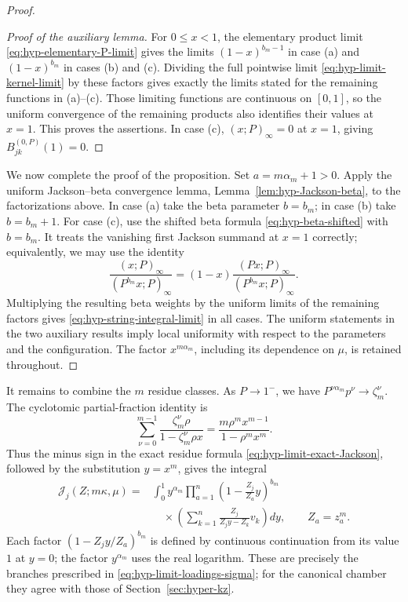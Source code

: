 \documentclass[12pt]{amsart}
\theoremstyle{definition}
\numberwithin{equation}{section}
\theoremstyle{definition}
\let\mc\mathcal
\let\ka\kappa
\let\le\leqslant
\def\beq{\begin{equation}}
\def\eeq{\end{equation}}
\begin{document}
\begin{proof}
\begin{proof}[Proof of the auxiliary lemma]
For $0\le x<1$, the elementary product limit
\eqref{eq:hyp-elementary-P-limit} gives the limits
$(1-x)^{b_m-1}$ in case (a) and
$(1-x)^{b_m}$ in cases (b) and (c).
Dividing the full pointwise limit
\eqref{eq:hyp-limit-kernel-limit} by these factors
gives exactly the limits stated for the remaining
functions in (a)--(c). Those limiting functions are
continuous on $[0,1]$, so the uniform convergence
of the remaining products also identifies their values
at $x=1$. This proves the assertions. In case (c),
$(x;P)_\infty=0$ at $x=1$, giving
$B_{jk}^{(0,P)}(1)=0$.
\end{proof}

We now complete the proof of the proposition. Set
$a=m\alpha_m+1>0$. Apply the uniform Jackson--beta
convergence lemma, Lemma~\ref{lem:hyp-Jackson-beta},
to the factorizations above. In case (a) take the beta
parameter $b=b_m$; in case (b) take $b=b_m+1$.
For case (c), use the shifted beta formula
\eqref{eq:hyp-beta-shifted} with $b=b_m$. It treats the
vanishing first Jackson summand at $x=1$ correctly;
equivalently, we may use the identity
\beq\label{eq:hyp-endpoint-zero-identity}
 \frac{(x;P)_\infty}{(P^{b_m}x;P)_\infty}
 =(1-x)\frac{(Px;P)_\infty}{(P^{b_m}x;P)_\infty}.
\eeq
Multiplying the resulting beta weights by the uniform
limits of the remaining factors gives
\eqref{eq:hyp-string-integral-limit} in all cases.
The uniform statements in the two auxiliary results
imply local uniformity with respect to the parameters
and the configuration. The factor $x^{m\alpha_m}$,
including its dependence on $\mu$, is retained throughout.
\end{proof}

It remains to combine the $m$ residue classes.  As
$P\to1^-$, we have $P^{\nu\alpha_m}p^\nu\to\zeta_m^\nu$.
The cyclotomic partial-fraction identity is
\beq\label{eq:hyp-limit-cyclotomic-sum}
 \sum_{\nu=0}^{m-1}
 \frac{\zeta_m^\nu\rho}{1-\zeta_m^\nu\rho x}
 =\frac{m\rho^m x^{m-1}}{1-\rho^m x^m}.
\eeq
Thus the minus sign in the exact residue formula
\eqref{eq:hyp-limit-exact-Jackson}, followed by the
substitution $y=x^m$, gives the integral
\beq\label{eq:hyp-limit-Jj}
 \begin{aligned}
 \mc J_j(Z;m\ka,\mu)
 ={}&\int_0^1y^{\alpha_m}
 \prod_{a=1}^n\left(1-\frac{Z_j}{Z_a}y\right)^{b_m}\\[-2pt]
 &\quad\times
 \left(\sum_{k=1}^n\frac{Z_j}{Z_jy-Z_k}v_k\right)dy,
 \qquad Z_a=z_a^m.
 \end{aligned}
\eeq
Each factor $(1-Z_jy/Z_a)^{b_m}$ is defined by continuous
continuation from its value $1$ at $y=0$; the factor
$y^{\alpha_m}$ uses the real logarithm. These are precisely
the branches prescribed in \eqref{eq:hyp-limit-loadings-sigma};
for the canonical chamber they agree with those of
Section~\ref{sec:hyper-kz}.
\end{document}

